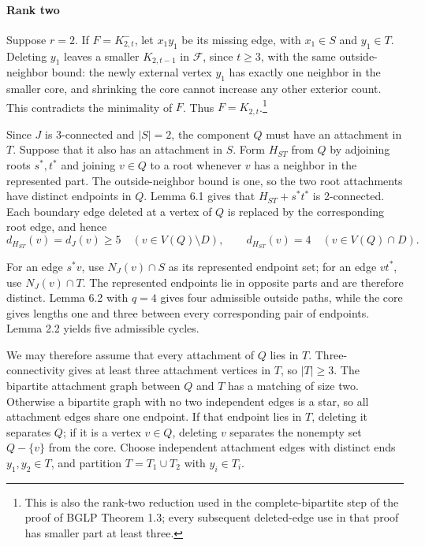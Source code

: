 \documentclass[
  11pt]{article}
\begin{document}

\paragraph{Rank two}\label{rank-two}

Suppose \(r=2\). If \(F=K_{2,t}^-\), let \(x_1y_1\) be its missing edge,
with \(x_1\in S\) and \(y_1\in T\). Deleting \(y_1\) leaves a smaller
\(K_{2,t-1}\) in \(\mathcal F\), since \(t\ge3\), with the same
outside-neighbor bound: the newly external vertex \(y_1\) has exactly
one neighbor in the smaller core, and shrinking the core cannot increase
any other exterior count. This contradicts the minimality of \(F\). Thus
\(F=K_{2,t}\).\footnote{This is also the rank-two reduction used in the
  complete-bipartite step of the proof of BGLP Theorem 1.3; every
  subsequent deleted-edge use in that proof has smaller part at least
  three.}


Since \(J\) is 3-connected and \(|S|=2\), the component \(Q\) must have
an attachment in \(T\). Suppose that it also has an attachment in \(S\).
Form \(H_{ST}\) from \(Q\) by adjoining roots \(s^*,t^*\) and joining
\(v\in Q\) to a root whenever \(v\) has a neighbor in the represented
part. The outside-neighbor bound is one, so the two root attachments
have distinct endpoints in \(Q\). Lemma 6.1 gives that \(H_{ST}+s^*t^*\)
is 2-connected. Each boundary edge deleted at a vertex of \(Q\) is
replaced by the corresponding root edge, and hence \[
 d_{H_{ST}}(v)=d_J(v)\ge5\quad(v\in V(Q)\setminus D),
 \qquad
 d_{H_{ST}}(v)=4\quad(v\in V(Q)\cap D).
\] 

For an edge \(s^*v\), use \(N_J(v)\cap S\) as its represented endpoint
set; for an edge \(vt^*\), use \(N_J(v)\cap T\). The represented
endpoints lie in opposite parts and are therefore distinct. Lemma 6.2
with \(q=4\) gives four admissible outside paths, while the core gives
lengths one and three between every corresponding pair of endpoints.
Lemma 2.2 yields five admissible cycles.

We may therefore assume that every attachment of \(Q\) lies in \(T\).
Three-connectivity gives at least three attachment vertices in \(T\), so
\(|T|\ge3\). The bipartite attachment graph between \(Q\) and \(T\) has
a matching of size two. Otherwise a bipartite graph with no two
independent edges is a star, so all attachment edges share one endpoint.
If that endpoint lies in \(T\), deleting it separates \(Q\); if it is a
vertex \(v\in Q\), deleting \(v\) separates the nonempty set \(Q-\{v\}\)
from the core. Choose independent attachment edges with distinct ends
\(y_1,y_2\in T\), and partition \(T=T_1\cup T_2\) with \(y_i\in T_i\).
\end{document}
